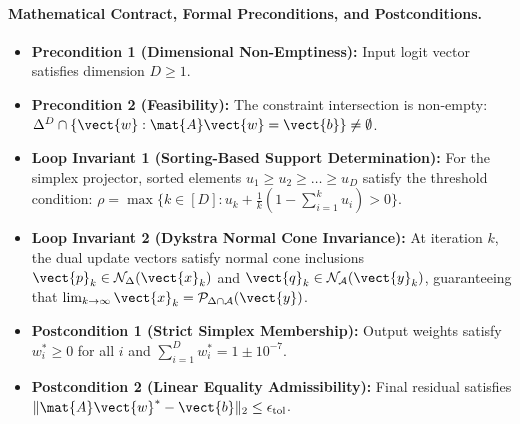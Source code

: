 \paragraph{Mathematical Contract, Formal Preconditions, and Postconditions.}
\begin{itemize}
    \item \textbf{Precondition 1 (Dimensional Non-Emptiness):} Input logit vector satisfies dimension $D \ge 1$.
    \item \textbf{Precondition 2 (Feasibility):} The constraint intersection is non-empty: $\Delta^D \cap \{\vect{w} : \mat{A}\vect{w} = \vect{b}\} \ne \emptyset$.
    \item \textbf{Loop Invariant 1 (Sorting-Based Support Determination):} For the simplex projector, sorted elements $u_1 \ge u_2 \ge \dots \ge u_D$ satisfy the threshold condition: $\rho = \max\{k \in [D] : u_k + \frac{1}{k}(1 - \sum_{i=1}^k u_i) > 0\}$.
    \item \textbf{Loop Invariant 2 (Dykstra Normal Cone Invariance):} At iteration $k$, the dual update vectors satisfy normal cone inclusions $\vect{p}_k \in \mathcal{N}_{\Delta}(\vect{x}_k)$ and $\vect{q}_k \in \mathcal{N}_{\mathcal{A}}(\vect{y}_k)$, guaranteeing that $\lim_{k \to \infty} \vect{x}_k = \mathcal{P}_{\Delta \cap \mathcal{A}}(\vect{y})$.
    \item \textbf{Postcondition 1 (Strict Simplex Membership):} Output weights satisfy $w_i^* \ge 0$ for all $i$ and $\sum_{i=1}^D w_i^* = 1 \pm 10^{-7}$.
    \item \textbf{Postcondition 2 (Linear Equality Admissibility):} Final residual satisfies $\|\mat{A}\vect{w}^* - \vect{b}\|_2 \le \epsilon_{\text{tol}}$.
\end{itemize}

